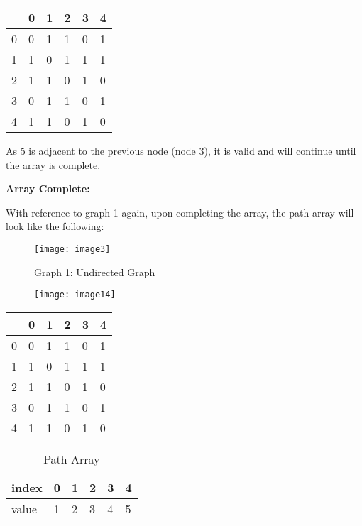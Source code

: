 \begin{table}[H]
    \centering
    \begin{tabular}{l | lllll}
          & 0 & 1 & 2 & 3 & 4  \\
        \hline
        0 & 0 & 1 & 1 & 0 & 1  \\
        1 & 1 & 0 & 1 & 1 & 1  \\
        2 & 1 & 1 & 0 & 1 & 0  \\
        3 & 0 & 1 & 1 & 0 & {\cellcolor[rgb]{0.933,0.804,0.804}}1  \\
        4 & 1 & 1 & 0 & 1 & 0 
    \end{tabular}
\end{table}

As 5 is adjacent to the previous node (node 3), it is valid and will continue
until the array is complete.

\textbf{Array Complete:}

With reference to graph 1 again, upon completing the array, the path array will look like the following:
 
\begin{figure}[H]
    \centering
    \texttt{[image: image3]}
    \caption{Graph 1: Undirected Graph}
\end{figure}

\begin{figure}[H]
    \centering
    \texttt{[image: image14]}
\end{figure}

\begin{table}[H]
    \centering
    \begin{tabular}{l | lllll}
          & 0 & 1 & 2 & 3 & 4  \\
        \hline
        0 & 0 & 1 & 1 & 0 & 1  \\
        1 & 1 & 0 & 1 & 1 & 1  \\
        2 & 1 & 1 & 0 & 1 & 0  \\
        3 & 0 & {\cellcolor[rgb]{0.863,0.914,0.835}}1 & 1 & 0 & 1  \\
        4 & 1 & 1 & 0 & 1 & 0 
    \end{tabular}
\end{table}

\begin{table}[H]
    \centering
    \caption{Path Array}
    \begin{tabular}{l | lllll}
        index & 0 & 1 & 2 & 3 & 4  \\
        \hline
        value & 1 & 2 & 3 & 4 & 5 \\
    \end{tabular}
\end{table}

